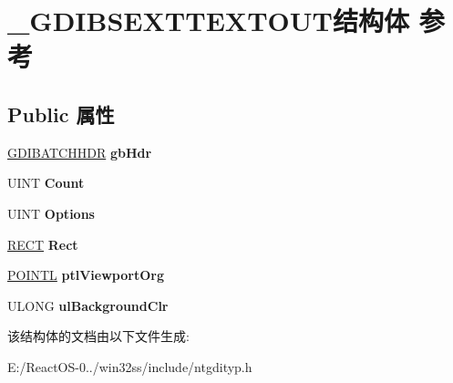 \hypertarget{struct___g_d_i_b_s_e_x_t_t_e_x_t_o_u_t}{}\section{\+\_\+\+G\+D\+I\+B\+S\+E\+X\+T\+T\+E\+X\+T\+O\+U\+T结构体 参考}
\label{struct___g_d_i_b_s_e_x_t_t_e_x_t_o_u_t}
\subsection*{Public 属性}
\begin{DoxyCompactItemize}
\item 
\mbox{\label{struct___g_d_i_b_s_e_x_t_t_e_x_t_o_u_t_a6b131aba5cbb5488a8a025da55fabc6d}} 
\hyperlink{struct___g_d_i_b_a_t_c_h_h_d_r}{G\+D\+I\+B\+A\+T\+C\+H\+H\+DR} {\bfseries gb\+Hdr}
\item 
\mbox{\label{struct___g_d_i_b_s_e_x_t_t_e_x_t_o_u_t_a830a444a12090921b7b55d341deae59e}} 
U\+I\+NT {\bfseries Count}
\item 
\mbox{\label{struct___g_d_i_b_s_e_x_t_t_e_x_t_o_u_t_ab18f904e0ddb069d91f486b154859639}} 
U\+I\+NT {\bfseries Options}
\item 
\mbox{\label{struct___g_d_i_b_s_e_x_t_t_e_x_t_o_u_t_a82cfafda4f9141f96b82f2e40edb2248}} 
\hyperlink{structtag_r_e_c_t}{R\+E\+CT} {\bfseries Rect}
\item 
\mbox{\label{struct___g_d_i_b_s_e_x_t_t_e_x_t_o_u_t_a0800c0dfb3c1426fd45b5a0494300411}} 
\hyperlink{struct___p_o_i_n_t_l}{P\+O\+I\+N\+TL} {\bfseries ptl\+Viewport\+Org}
\item 
\mbox{\label{struct___g_d_i_b_s_e_x_t_t_e_x_t_o_u_t_ada3de5c2479db53745c9839814732c6f}} 
U\+L\+O\+NG {\bfseries ul\+Background\+Clr}
\end{DoxyCompactItemize}


该结构体的文档由以下文件生成\+:\begin{DoxyCompactItemize}
\item 
E\+:/\+React\+O\+S-\/0../win32ss/include/ntgdityp.\+h\end{DoxyCompactItemize}
